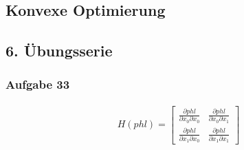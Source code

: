 \documentclass[paper=A3, 
   paper=landscape]{scrartcl}
\begin{document}
\begin{center}
	\section*{Konvexe Optimierung}
	\subsection*{6. Übungsserie}
\end{center}

\subsubsection*{Aufgabe 33}


\newcommand{\thefunc}{\xi_i^2 x_0^2 + 2 \xi_i x_0 x_1 - 2\xi_i x_0 \eta_i + x_1^2 -2 x_1 \eta_i   + \eta_i^2}
\newcommand{\z}{\xi_i x_0 + x_1 -\eta_i}


\begin{align}
H(phl) = \begin{bmatrix}
\frac{\partial phl }{\partial x_0 \partial  x_0} & \frac{\partial phl }{\partial x_0 \partial x_1}\\
\frac{\partial phl }{\partial x_1 \partial  x_0} & \frac{\partial phl }{\partial x_1 \partial x_1}
\end{bmatrix}
\end{align}




\newcommand{\dfuncaz}{\xi_i x_0 + x_1 -\eta_i}
\newcommand{\dfuncan}{\left( 1+ \left( \frac {\z} {\delta} \right) ^2\right)^\frac{1}{2} }




\newcommand{\dfagain}{\frac{1}{2}\left( 1+ \left( \frac {\z} {\delta} \right) ^2\right)^{-\frac{1}{2}}}
\end{document}
